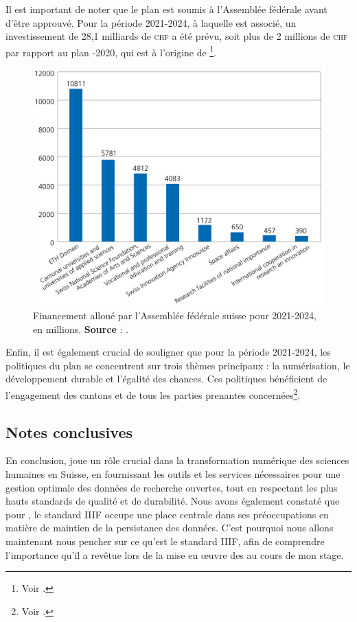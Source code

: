             Il est important de noter que le plan \erid est soumis à l'Assemblée fédérale avant d'être approuvé. Pour la période 2021-2024, à laquelle \dsc est associé, un investissement de 28,1 milliards de \textsc{chf} a été prévu, soit plus de 2 millions de \textsc{chf} par rapport au plan -2020, qui est à l'origine de \dsc\footnote{Voir \cite{sbfi}.}.

            \begin{figure}[h!]
                \centering
                \includegraphics[width=12cm]{02_images/part_01/04_investissemnt_eri_2021_2024.jpg}
                \caption{Financement \erid alloué par l'Assemblée fédérale suisse pour 2021-2024, en millions. \textbf{Source} : \cite{sbfi}.}
            \end{figure}
    
            Enfin, il est également crucial de souligner que pour la période 2021-2024, les politiques du plan \ERID se concentrent sur trois thèmes principaux : la numérisation, le développement durable et l'égalité des chances. Ces politiques bénéficient de l'engagement des cantons et de tous les parties prenantes concernées\footnote{Voir \cite{sbfi}.}.

        
        \subsection{Notes conclusives}
        
        En conclusion, \dsc joue un rôle crucial dans la transformation numérique des sciences humaines en Suisse, en fournissant les outils et les services nécessaires pour une gestion optimale des données de recherche ouvertes, tout en respectant les plus hauts standards de qualité et de durabilité. Nous avons également constaté que pour \dsc, le standard IIIF occupe une place centrale dans ses préoccupations en matière de maintien de la persistance des données. C'est pourquoi nous allons maintenant nous pencher sur ce qu'est le standard IIIF, afin de comprendre l'importance qu'il a revêtue lors de la mise en œuvre des  au cours de mon stage.


